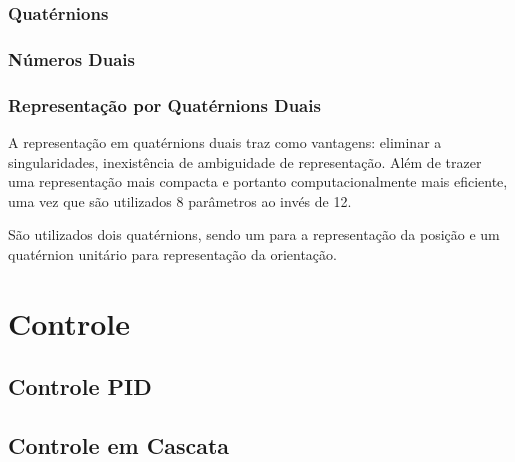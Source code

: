 \subsubsection{Quatérnions}
\subsubsection{Números Duais}
\subsubsection{Representação por Quatérnions Duais}

A representação em quatérnions duais traz como vantagens: eliminar a singularidades, inexistência de ambiguidade de representação. Além de trazer uma representação mais compacta e portanto computacionalmente mais eficiente, uma vez que são utilizados 8 parâmetros ao invés de 12. %

São utilizados dois quatérnions, sendo um para a representação da posição e um quatérnion unitário para representação da orientação. 

\section{Controle}




\subsection{Controle PID}

\subsection{Controle em Cascata}
